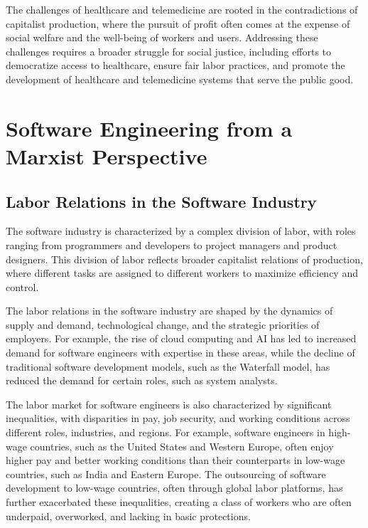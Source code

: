 \begin{refsection}
\begin{multicols}{2}
{The challenges of healthcare and telemedicine are rooted in the contradictions of capitalist production, where the pursuit of profit often comes at the expense of social welfare and the well-being of workers and users. Addressing these challenges requires a broader struggle for social justice, including efforts to democratize access to healthcare, ensure fair labor practices, and promote the development of healthcare and telemedicine systems that serve the public good.
}
\newpage
\end{multicols}
\section{Software Engineering from a Marxist Perspective}
\begin{multicols}{2}
{\small
\subsection{Labor Relations in the Software Industry}

The software industry is characterized by a complex division of labor, with roles ranging from programmers and developers to project managers and product designers. This division of labor reflects broader capitalist relations of production, where different tasks are assigned to different workers to maximize efficiency and control.

The labor relations in the software industry are shaped by the dynamics of supply and demand, technological change, and the strategic priorities of employers. For example, the rise of cloud computing and AI has led to increased demand for software engineers with expertise in these areas, while the decline of traditional software development models, such as the Waterfall model, has reduced the demand for certain roles, such as system analysts.

The labor market for software engineers is also characterized by significant inequalities, with disparities in pay, job security, and working conditions across different roles, industries, and regions. For example, software engineers in high-wage countries, such as the United States and Western Europe, often enjoy higher pay and better working conditions than their counterparts in low-wage countries, such as India and Eastern Europe. The outsourcing of software development to low-wage countries, often through global labor platforms, has further exacerbated these inequalities, creating a class of workers who are often underpaid, overworked, and lacking in basic protections.

}
\end{multicols}
\end{refsection}
